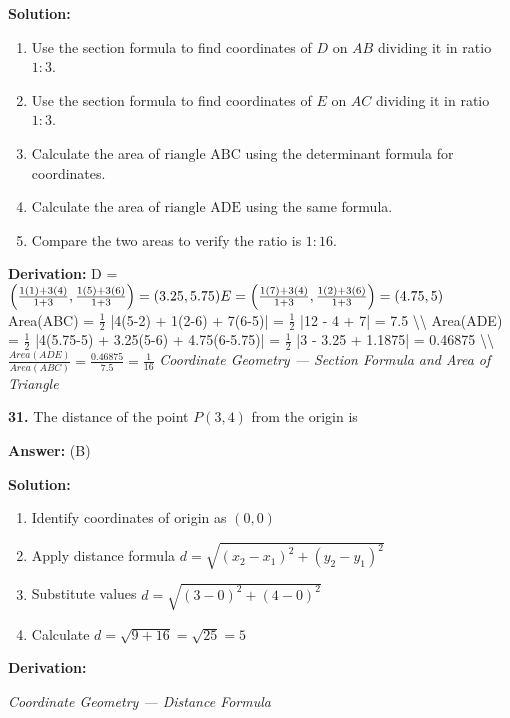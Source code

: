 \documentclass[12pt,a4paper]{exam}
\newcommand{\fitmath}[1]{%
  \sbox{\schmathbox}{$\displaystyle #1$}%
  \ifdim\wd\schmathbox>\linewidth
    \resizebox{\linewidth}{!}{\usebox{\schmathbox}}%
  \else
    \usebox{\schmathbox}%
  \fi}
\begin{document}
\begin{questions}
\textbf{Solution:}
\begin{enumerate}
  \item Use the section formula to find coordinates of $D$ on $AB$ dividing it in ratio $1:3$.
  \item Use the section formula to find coordinates of $E$ on $AC$ dividing it in ratio $1:3$.
  \item Calculate the area of $\text{riangle ABC}$ using the determinant formula for coordinates.
  \item Calculate the area of $\text{riangle ADE}$ using the same formula.
  \item Compare the two areas to verify the ratio is $1:16$.
\end{enumerate}
\textbf{Derivation:}
D = $\left( \frac{1(1)+3(4)}{1+3}, \frac{1(5)+3(6)}{1+3} \right) = (3.25, 5.75) \\ E = \left( \frac{1(7)+3(4)}{1+3}, \frac{1(2)+3(6)}{1+3} \right) = (4.75, 5) \\$ Area(ABC) = $\frac{1}{2}$ |4(5-2) + 1(2-6) + 7(6-5)| = $\frac{1}{2}$ |12 - 4 + 7| = 7.5 \textbackslash{}\textbackslash{} Area(ADE) = $\frac{1}{2}$ |4(5.75-5) + 3.25(5-6) + 4.75(6-5.75)| = $\frac{1}{2}$ |3 - 3.25 + 1.1875| = 0.46875 \textbackslash{}\textbackslash{} $\frac{Area(ADE)}{Area(ABC)} = \frac{0.46875}{7.5} = \frac{1}{16}$
\hfill \textit{Coordinate Geometry — Section Formula and Area of Triangle}
\vspace{0.3cm}

\question \textbf{31.} The distance of the point $P(3, 4)$ from the origin is

\textbf{Answer:}
(B)

\textbf{Solution:}
\begin{enumerate}
  \item Identify coordinates of origin as $(0, 0)$
  \item Apply distance formula $d = \sqrt{(x_2 - x_1)^2 + (y_2 - y_1)^2}$
  \item Substitute values $d = \sqrt{(3-0)^2 + (4-0)^2}$
  \item Calculate $d = \sqrt{9 + 16} = \sqrt{25} = 5$
\end{enumerate}
\textbf{Derivation:}
\begin{center}
\fitmath{d = \sqrt{(3-0)^2 + (4-0)^2} \ d = \sqrt{3^2 + 4^2} \ d = \sqrt{9+16} \ d = \sqrt{25} = 5}
\end{center}
\hfill \textit{Coordinate Geometry — Distance Formula}
\vspace{0.3cm}


\end{questions}
\end{document}
